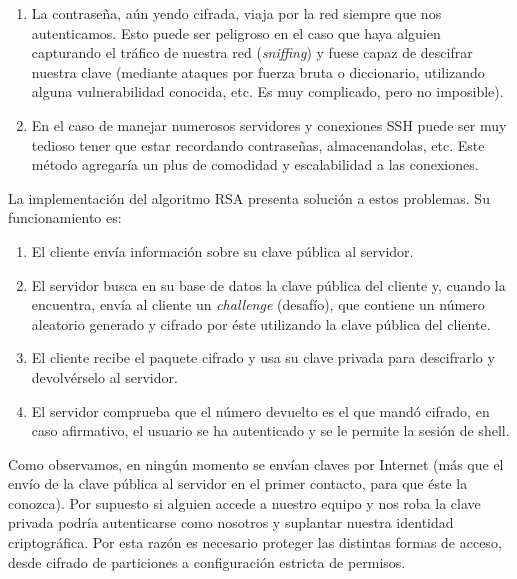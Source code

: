 \documentclass[a4paper, 11pt, titlepage]{article}
\begin{document}
        \begin{enumerate}
            \item La contraseña, aún yendo cifrada, viaja por la red siempre que nos autenticamos.
            Esto puede ser peligroso en el caso que haya alguien capturando el tráfico de nuestra 
            red (\textit{sniffing}) y fuese capaz de descifrar nuestra clave (mediante ataques por 
            fuerza bruta o diccionario, utilizando alguna vulnerabilidad conocida, etc. Es muy 
            complicado, pero no imposible).
            \item En el caso de manejar numerosos servidores y conexiones SSH puede ser muy tedioso 
            tener que estar recordando contraseñas, almacenandolas, etc. Este método agregaría un plus 
            de comodidad y escalabilidad a las conexiones.
        \end{enumerate}

        La implementación del algoritmo RSA presenta solución a estos problemas. Su funcionamiento
        es:

        \begin{enumerate}
            \item El cliente envía información sobre su clave pública al servidor.
            \item El servidor busca en su base de datos la clave pública del cliente y, cuando la encuentra,
            envía al cliente un \textit{challenge} (desafío), que contiene un número aleatorio generado y 
            cifrado por éste utilizando la clave pública del cliente.
            \item El cliente recibe el paquete cifrado y usa su clave privada para descifrarlo y devolvérselo 
            al servidor.
            \item El servidor comprueba que el número devuelto es el que mandó cifrado, en caso afirmativo, el 
            usuario se ha autenticado y se le permite la sesión de shell.
        \end{enumerate}

        Como observamos, en ningún momento se envían claves por Internet (más que el envío 
        de la clave pública al servidor en el primer contacto, para que éste la conozca). Por 
        supuesto si alguien accede a nuestro equipo y nos roba la clave privada podría autenticarse 
        como nosotros y suplantar nuestra identidad criptográfica. Por esta razón es necesario 
        proteger las distintas formas de acceso, desde cifrado de particiones a configuración 
        estricta de permisos. 
        
\end{document}
